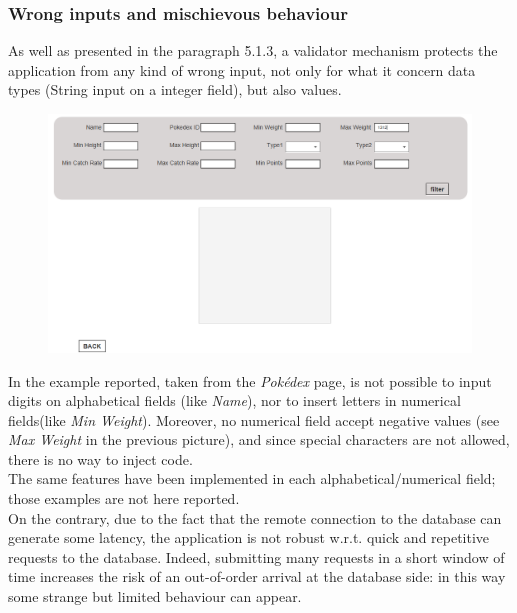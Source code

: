 \subsubsection{Wrong inputs and mischievous behaviour}
As well as presented in the paragraph 5.1.3, a validator mechanism protects the application from any kind of wrong input, not only for what it concern data types (String input on a integer field), but also values.

\begin{figure}[H]
	\centering
	\includegraphics[width=\textwidth]{img/wrong_input.png}
\end{figure}

In the example reported, taken from the \textit{Pokédex} page, is not possible to input digits on alphabetical fields (like \textit{Name}), nor to insert letters in numerical fields(like \textit{Min Weight}). Moreover, no numerical field accept negative values (see \textit{Max Weight} in the previous picture), and since special characters are not allowed, there is no way to inject code.\\
The same features have been implemented in each alphabetical/numerical field; those examples are not here reported.\\
On the contrary, due to the fact that the remote connection to the database can generate some latency, the application is not robust w.r.t. quick and repetitive requests to the database. Indeed, submitting many requests in a short window of time increases the risk of an out-of-order arrival at the database side: in this way some strange but limited behaviour can appear.

